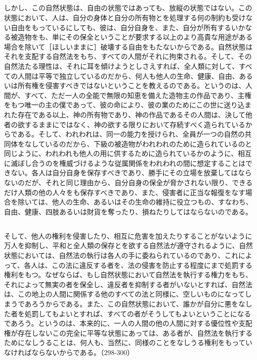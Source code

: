 \subsection{}


しかし、この自然状態は、自由の状態ではあっても、放縦の状態ではない。この状態において、人は、自分の身体と自分の所有物とを処理する何の制約も受けない自由をもっているにしても、彼は、自分自身を、また、自分が所有するいかなる被造物をも、単にその保全ということが要求する以上のより高貴な用途がある場合を除いて［ほしいままに］破壊する自由をもたないからである。自然状態はそれを支配する自然法をもち、すべての人間がそれに拘束される。そして、その自然法たる理性は、それに耳を傾けようとしさえすれば、全人類に対して、すべての人間は平等で独立しているのだから、何人も他人の生命、健康、自由、あるいは所有権を侵害すべきではないということを教えるのである。というのは、人間が、すべて、ただ一人の全能で無限の知恵を備えた造物主の作品であり、主権をもつ唯一の主の僕であって、彼の命により、彼の業のためにこの世に送り込まれた存在である以上、神の所有物であり、神の作品であるその人間は、決して他者の欲するままにではなく、神の欲する限りにおいて存続すべく造られているからである。そして、われわれは、同一の能力を授けられ、全員が一つの自然の共同体をなしているのだから、下級の被造物がわれわれのために造られているのと同じように、われわれも他人の用に供するために造られているかのように、相互に滅ぼし合うのを権威づけるような従属関係をわれわれの間に想定することはできない。各人は自分自身を保存すべきであり、勝手にその立場を放棄してはならないのだが、それと同じ理由から、自分自身の保全が脅かされない限り、できるだけ人類の他の人々をも保存すべきであり、また、侵害者に正当な報復をなす場合を除いては、他人の生命、あるいはその生命の維持に役立つもの、すなわち、自由、健康、四肢あるいは財貨を奪ったり、損ねたりしてはならないのである。

\subsection{}



そして、他人の権利を侵害したり、相互に危害を加えたりすることがないように万人を抑制し、平和と全人類の保存とを欲する自然法が遵守されるように、自然状態においては、自然法の執行は各人の手に委ねられているのであり、これによって、各人は、この法に違反する者を、法の侵害を防止する程度にまで処罰する権利をもつ。なぜならば、もし自然状態において自然法を執行する権力をもち、それによって無実の者を保全し、違反者を抑制する者がいないとすれば、自然法は、この地上の人間に関係する他のすべての法と同様に、空しいものになってしまうであろうからである。また、この自然状態において、誰かが自分に悪をなした者を処罰してもよいとすれば、すべての者がそうしてもよいということになるであろう。というのは、本来的に、一人の人間の他の人間に対する優位性や支配権が存在しないこの完全に平等な状態にあっては、ある者が、自然法を執行するためになしうることは、何人も、当然に、同様のことをなしうる権利をもっていなければならないからである。（298-300）


